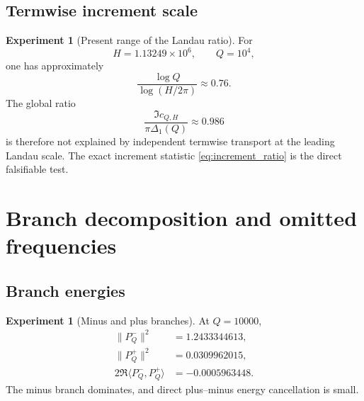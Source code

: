 \documentclass[11pt]{amsart}
\numberwithin{equation}{section}
\theoremstyle{plain}
\theoremstyle{definition}
\newtheorem{experiment}[theorem]{Experiment}
\theoremstyle{remark}
\newcommand{\1}{\mathbf{1}}
\begin{document}
\subsection{Termwise increment scale}
\label{subsec:numerical_increment_scale}

\begin{experiment}[Present range of the Landau ratio]
\label{exp:numerical_landau_ratio}
For
\begin{equation}
H=1.13249\times10^6,
\qquad Q=10^4,
\label{eq:numerical_H_Q_pair}
\end{equation}
one has approximately
\begin{equation}
\frac{\log Q}{\log(H/2\pi)}\approx0.76.
\label{eq:numerical_log_ratio}
\end{equation}
The global ratio
\begin{equation}
\frac{\Im c_{Q,H}}{\pi\Delta_1(Q)}\approx0.986
\label{eq:numerical_global_ratio_again}
\end{equation}
is therefore not explained by independent termwise transport at the
leading Landau scale.  The exact increment statistic
\eqref{eq:increment_ratio} is the direct falsifiable test.
\end{experiment}

\section{Branch decomposition and omitted frequencies}
\label{sec:numerical_branches_omitted}

\subsection{Branch energies}
\label{subsec:numerical_branch_energies}

\begin{experiment}[Minus and plus branches]
\label{exp:numerical_branch_energy_detailed}
At $Q=10000$,
\begin{align}
\|P_Q^-\|^2
&=1.2433344613,
\label{eq:numerical_minus_energy_detailed}
\\
\|P_Q^+\|^2
&=0.0309962015,
\label{eq:numerical_plus_energy_detailed}
\\
2\Re\langle P_Q^-,P_Q^+\rangle
&=-0.0005963448.
\label{eq:numerical_cross_energy_detailed}
\end{align}
The minus branch dominates, and direct plus--minus energy cancellation is
small.
\end{experiment}
\end{document}
